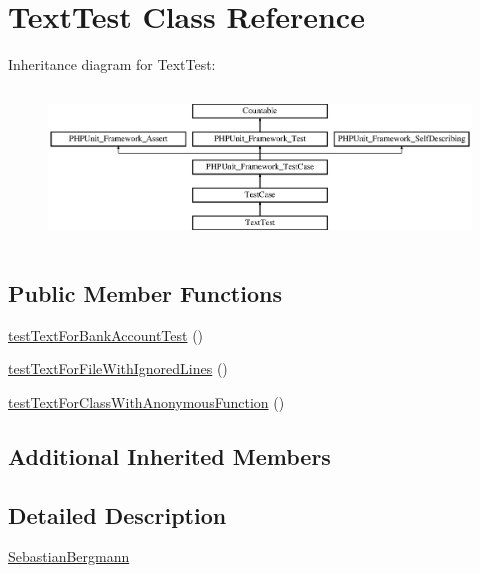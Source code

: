 \hypertarget{class_sebastian_bergmann_1_1_code_coverage_1_1_report_1_1_text_test}{}\section{Text\+Test Class Reference}
\label{class_sebastian_bergmann_1_1_code_coverage_1_1_report_1_1_text_test}
Inheritance diagram for Text\+Test\+:\begin{figure}[H]
\begin{center}
\leavevmode
\includegraphics[height=4.129793cm]{class_sebastian_bergmann_1_1_code_coverage_1_1_report_1_1_text_test}
\end{center}
\end{figure}
\subsection*{Public Member Functions}
\begin{DoxyCompactItemize}
\item 
\mbox{\hyperlink{class_sebastian_bergmann_1_1_code_coverage_1_1_report_1_1_text_test_ae3692c8901a24087aca7b25c3190eef6}{test\+Text\+For\+Bank\+Account\+Test}} ()
\item 
\mbox{\hyperlink{class_sebastian_bergmann_1_1_code_coverage_1_1_report_1_1_text_test_a3db803b46a25d6527456a21251ef34a1}{test\+Text\+For\+File\+With\+Ignored\+Lines}} ()
\item 
\mbox{\hyperlink{class_sebastian_bergmann_1_1_code_coverage_1_1_report_1_1_text_test_aa8a495fa04563c02a27f9f94477ecba4}{test\+Text\+For\+Class\+With\+Anonymous\+Function}} ()
\end{DoxyCompactItemize}
\subsection*{Additional Inherited Members}


\subsection{Detailed Description}
\mbox{\hyperlink{namespace_sebastian_bergmann}{Sebastian\+Bergmann}} 

